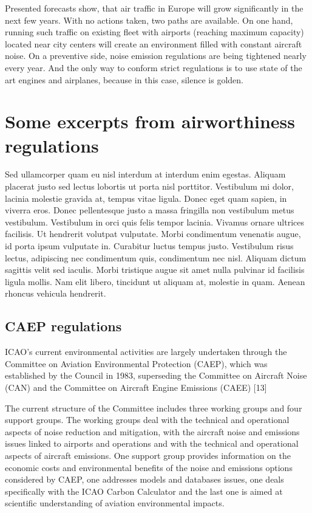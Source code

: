 Presented forecasts show, that air traffic in Europe will grow significantly in the next few years. With no actions taken, two paths are available. On one hand, running such traffic on existing fleet with airports (reaching maximum capacity) located near city centers will create an environment filled with constant aircraft noise. On a preventive side, noise emission regulations are being tightened nearly every year. And the only way to conform strict regulations is to use state of the art engines and airplanes, because in this case, silence is golden.

\section{Some excerpts from airworthiness regulations}

Sed ullamcorper quam eu nisl interdum at interdum enim egestas. Aliquam placerat justo sed lectus lobortis ut porta nisl porttitor. Vestibulum mi dolor, lacinia molestie gravida at, tempus vitae ligula. Donec eget quam sapien, in viverra eros. Donec pellentesque justo a massa fringilla non vestibulum metus vestibulum. Vestibulum in orci quis felis tempor lacinia. Vivamus ornare ultrices facilisis. Ut hendrerit volutpat vulputate. Morbi condimentum venenatis augue, id porta ipsum vulputate in. Curabitur luctus tempus justo. Vestibulum risus lectus, adipiscing nec condimentum quis, condimentum nec nisl. Aliquam dictum sagittis velit sed iaculis. Morbi tristique augue sit amet nulla pulvinar id facilisis ligula mollis. Nam elit libero, tincidunt ut aliquam at, molestie in quam. Aenean rhoncus vehicula hendrerit.

\subsection{CAEP regulations}

ICAO's current environmental activities are largely undertaken through the Committee on Aviation Environmental Protection (CAEP), which was established by the Council in 1983, superseding the Committee on Aircraft Noise (CAN) and the Committee on Aircraft Engine Emissions (CAEE) [13]

The current structure of the Committee includes three working groups and four support groups. The working groups deal with the technical and operational aspects of noise reduction and mitigation, with the aircraft noise and emissions issues linked to airports and operations and with the technical and operational aspects of aircraft emissions. One support group provides information on the economic costs and environmental benefits of the noise and emissions options considered by CAEP, one addresses models and databases issues, one deals specifically with the ICAO Carbon Calculator and the last one is aimed at scientific understanding of aviation environmental impacts.
 
